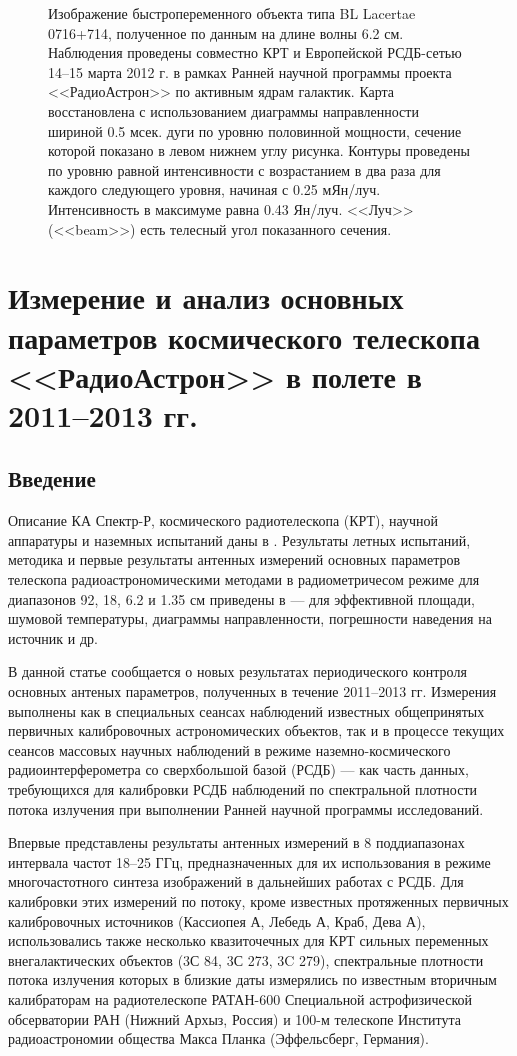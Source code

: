 \begin{figure}[tbh]
{ }
 \caption{Изображение быстропеременного объекта типа BL Lacertae 0716+714, полученное
по данным на длине волны 6.2 см. Наблюдения проведены совместно КРТ и Европейской
РСДБ-сетью 14--15 марта 2012 г. в рамках Ранней научной программы проекта
<<РадиоАстрон>> по активным ядрам галактик. Карта восстановлена
с использованием диаграммы направленности шириной 0.5 мсек. дуги
по уровню половинной мощности, сечение которой показано в левом нижнем углу
рисунка.  Контуры проведены по уровню равной интенсивности с
возрастанием в два раза для каждого следующего уровня, начиная с 0.25 мЯн/луч.
Интенсивность в максимуме равна 0.43 Ян/луч. <<Луч>> (<<beam>>) есть телесный
угол показанного сечения.}
 \label{fig:map_0716}
\end{figure}


\section{Измерение и анализ основных параметров космического телескопа <<РадиоАстрон>> в полете в
2011--2013 гг.}

\subsection{Введение}

Описание КА Спектр-Р, космического радиотелескопа (КРТ), научной аппаратуры и наземных испытаний
даны в \cite{Khartov_2011,Alexandrov_2011a,Alexandrov_2011b}. Результаты летных испытаний, методика
и первые результаты антенных измерений основных параметров телескопа радиоастрономическими методами
в радиометричесом режиме для диапазонов 92, 18, 6.2 и 1.35 см приведены в
\cite{Avdeev_2012,Kardashev_2013_rus,RAUH} --- для эффективной площади, шумовой температуры,
диаграммы направленности, погрешности наведения на источник и др.

В данной статье сообщается о новых результатах периодического контроля основных
антеных параметров, полученных в течение 2011--2013 гг. Измерения выполнены  как
в специальных сеансах наблюдений известных общепринятых первичных калибровочных
астрономических объектов, так и в процессе текущих сеансов массовых научных
наблюдений в режиме наземно-космического радиоинтерферометра со сверхбольшой
базой (РСДБ) --- как часть данных, требующихся для калибровки РСДБ наблюдений по
спектральной плотности потока излучения при выполнении Ранней научной программы
исследований.

Впервые представлены результаты антенных измерений в 8 поддиапазонах интервала частот 18--25 ГГц,
предназначенных для их использования в режиме многочастотного синтеза изображений в дальнейших
работах с РСДБ. Для калибровки этих измерений по потоку, кроме известных протяженных первичных
калибровочных источников (Кассиопея А, Лебедь А, Краб, Дева А), использовались также несколько
квазиточечных для КРТ сильных переменных внегалактических объектов (3С 84, 3С 273, 3C 279),
спектральные плотности потока излучения которых в близкие даты измерялись по известным вторичным
калибраторам на радиотелескопе РАТАН-600 Специальной астрофизической обсерватории РАН (Нижний Архыз,
Россия) и 100-м телескопе Института радиоастрономии общества Макса Планка (Эффельсберг, Германия).

